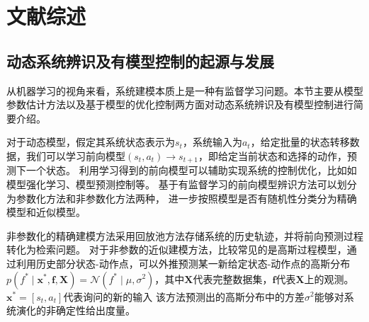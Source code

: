 \chapter{文献综述}
    



\section{动态系统辨识及有模型控制的起源与发展}
\label{sec:2_1}

从机器学习的视角来看，系统建模本质上是一种有监督学习问题\cite{jordan1992forward}。本节主要从模型参数估计方法以及基于模型的优化控制两方面对动态系统辨识及有模型控制进行简要介绍。

对于动态模型，假定其系统状态表示为$s_t$，系统输入为$a_t$，给定批量的状态转移数据，我们可以学习前向模型$\left(s_t, a_t\right) \rightarrow s_{t+1}$，即给定当前状态和选择的动作，预测下一个状态。
利用学习得到的前向模型可以辅助实现系统的控制优化，比如如模型强化学习、模型预测控制等\cite{moerland2020model}。
基于有监督学习的前向模型辨识方法可以划分为参数化方法和非参数化方法两种，
进一步按照模型是否有随机性分类分为精确模型和近似模型。

非参数化的精确建模方法采用回放池\cite{lin1992memory}方法存储系统的历史轨迹，并将前向预测过程转化为检索问题。
对于非参数的近似建模方法，比较常见的是高斯过程模型\cite{deisenroth2011pilco,deisenroth2011pilco}，通过利用历史部分状态-动作点，可以外推预测某一新给定状态-动作点的高斯分布$p\left(f^* \mid \boldsymbol{x}^*, \boldsymbol{f}, \boldsymbol{X}\right)=\mathcal{N}\left(f^* \mid \mu, \sigma^2\right)$，其中$\boldsymbol{X}$代表完整数据集，$\boldsymbol{f}$代表$\boldsymbol{X}$上的观测。$\boldsymbol{x}^*=[s_t,a_t]$代表询问的新的输入
该方法预测出的高斯分布中的方差$\sigma^2$能够对系统演化的非确定性给出度量。

